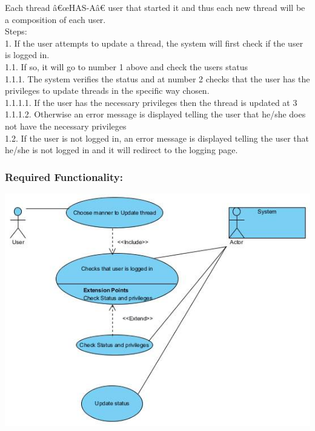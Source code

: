 \documentclass[a4paper,11pt]{article}
\begin{document}
Each thread â€œHAS-Aâ€ user that started it and thus each new thread will be a composition of each user.\\
Steps:\\
1.	If the user attempts to update a thread, the system will first check if the user is logged in.\\
1.1.	If so, it will go to number 1 above and check the users status\\
1.1.1.	The system verifies the status and at number 2 checks that the user has the privileges to update threads in the specific way chosen.\\
1.1.1.1.	If the user has the necessary privileges then the thread is updated at 3\\
1.1.1.2.	Otherwise an error message is displayed telling the user that he/she does not have the necessary privileges \\
1.2.	If the user is not logged in, an error message is displayed telling the user that he/she is not logged in and it will redirect to the logging page.\\
\subsubsection{Required Functionality:}
\includegraphics[width=1\linewidth]{./Images/CRUDThread/Diagrams/10.jpg}\\
\end{document}
